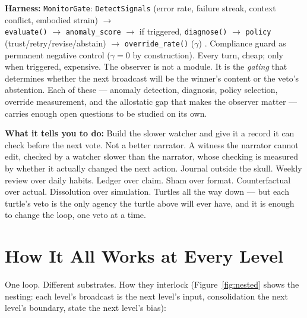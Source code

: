 \documentclass[11pt]{article}
\begin{document}
{\textbf{Harness:} \texttt{MonitorGate}: \texttt{DetectSignals} (error rate, failure streak, context conflict, embodied strain) $\to$\allowbreak{}\\ \texttt{evaluate()} $\to$\allowbreak{} \texttt{anomaly\_score} $\to$\allowbreak{} if triggered, \texttt{diagnose()} $\to$\allowbreak{} \texttt{policy} (trust/retry/revise/abstain) $\to$\allowbreak{} \texttt{override\_rate()} ($\gamma$) \citep{macar2026,cao2026}. Compliance guard as permanent negative control ($\gamma=0$ by construction). Every turn, cheap; only when triggered, expensive. The observer is not a module. It is the \emph{gating} that determines whether the next broadcast will be the winner's content or the veto's abstention. Each of these --- anomaly detection, diagnosis, policy selection, override measurement, and the allostatic gap that makes the observer matter --- carries enough open questions to be studied on its own.

\textbf{What it tells you to do:} Build the slower watcher and give it a record it can check before the next vote. Not a better narrator. A witness the narrator cannot edit, checked by a watcher slower than the narrator, whose checking is measured by whether it actually changed the next action. Journal outside the skull. Weekly review over daily habits. Ledger over claim. Sham over format. Counterfactual over actual. Dissolution over simulation. Turtles all the way down --- but each turtle's veto is the only agency the turtle above will ever have, and it is enough to change the loop, one veto at a time.

\section{How It All Works at Every Level}
\label{sec:levels}

One loop. Different substrates. How they interlock (Figure~\ref{fig:nested} shows the nesting: each level's broadcast is the next level's input, consolidation the next level's boundary, state the next level's bias):

}
\end{document}
